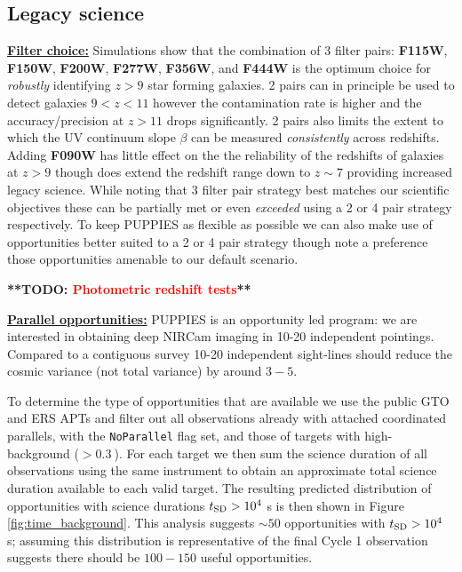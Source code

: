 \documentclass[12pt]{article}
\newcommand{\todo}[1]{\textbf{**TODO: \textcolor{red}{#1}**}}
\begin{document}
\subsection*{Legacy science}







%
%

\clearpage

\justifyobservations   %

\noindent
\underline{\bf Filter choice:} Simulations show that the combination of 3 filter pairs: {\bf F115W}, {\bf F150W}, {\bf F200W}, {\bf F277W}, {\bf F356W}, and {\bf F444W} is the optimum choice for \emph{robustly} identifying $z>9$ star forming galaxies. 2 pairs can in principle be used to detect galaxies $9<z<11$ however the contamination rate is higher and the accuracy/precision at $z>11$ drops significantly. 2 pairs also limits the extent to which the UV continuum slope $\beta$ can be measured \emph{consistently} across redshifts. Adding {\bf F090W} has little effect on the the reliability of the redshifts of galaxies at $z>9$ though does extend the redshift range down to $z\sim 7$ providing increased legacy science. While noting that 3 filter pair strategy best matches our scientific objectives these can be partially met or even \emph{exceeded} using a 2 or 4 pair strategy respectively. To keep PUPPIES as flexible as possible we can also make use of opportunities better suited to a 2 or 4 pair strategy though note a preference those opportunities amenable to our default scenario.

\todo{Photometric redshift tests}

\noindent
\underline{\bf Parallel opportunities:} PUPPIES is an opportunity led program: we are interested in obtaining deep NIRCam imaging in 10-20 independent pointings. Compared to a contiguous survey 10-20 independent sight-lines should reduce the cosmic variance (not total variance) by around $3-5$.

\noindent
To determine the type of opportunities that are available we use the public GTO and ERS APTs and filter out all observations already with attached coordinated parallels, with the \texttt{NoParallel} flag set, and those of targets with high-background ($>0.3\ $). For each target we then sum the science duration of all observations using the same instrument to obtain an approximate total science duration available to each valid target. The resulting predicted distribution of opportunities with science durations $t_{\rm SD}>10^{4}$ s is then shown in Figure \ref{fig:time_background}. This analysis suggests $\sim 50$ opportunities with $t_{\rm SD}>10^{4}$ s; assuming this distribution is representative of the final Cycle 1 observation suggests there should be $100-150$ useful opportunities.
\end{document}
